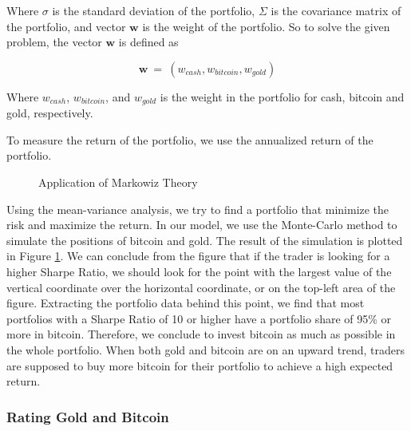 \documentclass[12pt,a4paper]{article}
\begin{document}
\begin{spacing}{1.2}
Where $\sigma$ is the standard deviation of the portfolio, $\Sigma$ is the covariance matrix of the portfolio, and vector $\mathbf{w}$ is the weight of the portfolio. So to solve the given problem, the vector $\mathbf{w}$ is defined as 

$$
\mathbf{w} \ = \ (w_{cash},w_{bitcoin},w_{gold})
$$

Where $w_{cash}$, $w_{bitcoin}$, and $w_{gold}$ is the weight in the portfolio for cash, bitcoin and gold, respectively. 

To measure the return of the portfolio, we use the annualized return of the portfolio.

\begin{figure}[H]
	\caption{Application of Markowiz Theory}
	\label{figure:markowiz}
\end{figure}

Using the mean-variance analysis, we try to find a portfolio that minimize the risk and maximize the return. In our model, we use the Monte-Carlo method to simulate the positions of bitcoin and gold. The result of the simulation is plotted in Figure \ref{figure:markowiz}.
We can conclude from the figure that if the trader is looking for a higher Sharpe Ratio, we should look for the point with the largest value of the vertical coordinate over the horizontal coordinate, or on the top-left area of the figure.
Extracting the portfolio data behind this point, we find that most portfolios with a Sharpe Ratio of 10 or higher have a portfolio share of 95\% or more in bitcoin.
Therefore, we conclude to invest bitcoin as much as possible in the whole portfolio. When both gold and bitcoin are on an upward trend, traders are supposed to buy more bitcoin for their portfolio to achieve a high expected return.


\subsubsection{Rating Gold and Bitcoin}


\end{spacing}
\end{document}
